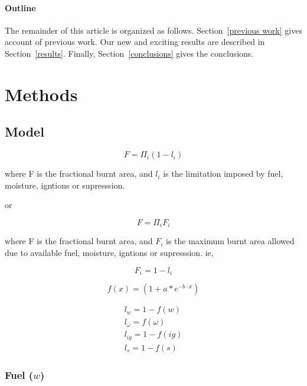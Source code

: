 \documentclass[12pt]{article}
\begin{document}
\paragraph{Outline}
The remainder of this article is organized as follows.
Section~\ref{previous work} gives account of previous work.
Our new and exciting results are described in Section~\ref{results}.
Finally, Section~\ref{conclusions} gives the conclusions.

\section{Methods}

\subsection{Model}

\begin{equation}
    F=\Pi_{i} (1 - l_i)
\end{equation}

where F is the fractional burnt area, and $l_i$ is the limitation imposed by fuel, moisture, igntions or supresssion.
\newline

or

\begin{equation} 
    F=\Pi_{i} F_i 
\end{equation}

where F is the fractional burnt area, and $F_i$ is the maximum burnt area allowed due to available fuel, moisture, igntions or supresssion. ie, 

\begin{equation}
    F_i = 1 - l_i
\end{equation}

\begin{equation}
    f(x) = (1 + a * e^{-b \cdot x})
\end{equation}

\begin{equation}
\begin{split}
    l_{w} = 1 - f(w) \\
    l_{\omega} = f(\omega) \\
    l_{ig} = 1 - f(ig) \\
    l_{s} = 1- f(s)
\end{split}
\end{equation}


\subsubsection{Fuel ($w$)}
\end{document}

